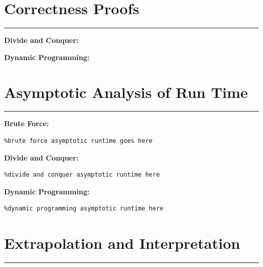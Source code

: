 \documentclass[letterpaper,10pt,titlepage,fleqn]{article}
\begin{document}
    \section*{Correctness Proofs}
    \hrule

    \begin{centering}
    \textbf{Divide and Conquer:}
    \end{centering}


    \begin{centering}
    \textbf{Dynamic Programming:}
    \end{centering}








\section*{Asymptotic Analysis of Run Time}
\hrule
\begin{centering}
\textbf{Brute Force:}
\end{centering}

\begin{lstlisting}%brute force asymptotic runtime goes here

\end{lstlisting}

\begin{centering}
\textbf{Divide and Conquer:}
\end{centering}

\begin{lstlisting}%divide and conquer asymptotic runtime here

\end{lstlisting}

\begin{centering}
\textbf{Dynamic Programming:}
\end{centering}

\begin{lstlisting}%dynamic programming asymptotic runtime here

\end{lstlisting}



\section*{Extrapolation and Interpretation}
\hrule
\end{document}
